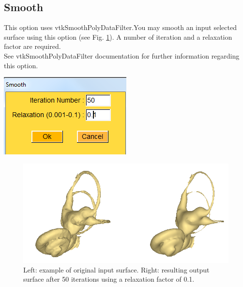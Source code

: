 \subsection{Smooth}
\noindent
\begin{minipage}{0.5\textwidth}
This option uses vtkSmoothPolyDataFilter.You may smooth an input
selected surface using this option (see Fig. \ref{smooth}). A number of iteration and a
relaxation factor are required.\\
See vtkSmoothPolyDataFilter documentation for further information regarding this option.
\end{minipage}    
\begin{minipage}{0.5\textwidth}\centering
  \includegraphics[scale=0.5]{images/Edit_selected_objects/05_smooth2.png}
 \end{minipage} 
\noindent

\begin{figure}
  \centering
  \includegraphics[scale=0.5]{images/Edit_selected_objects/05_smooth.png} 
	\caption{Left: example of original input surface. Right: resulting output surface after 50 iterations using a relaxation factor of 0.1.}
\label{smooth}
 
\end{figure}






